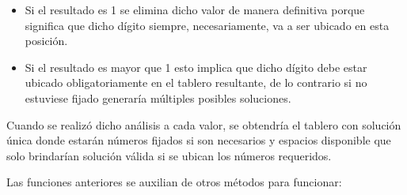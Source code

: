 \documentclass[10pt]{amsart}
\begin{document}
        \begin{itemize}
        
            \item Si el resultado es 1 se elimina dicho valor de manera definitiva porque significa que dicho d\'igito siempre, necesariamente, va a ser ubicado en esta posici\'on.
        
            \item Si el resultado es mayor que 1 esto implica que dicho d\'igito debe estar ubicado obligatoriamente en el tablero resultante, de lo contrario si no estuviese fijado generar\'ia m\'ultiples posibles soluciones.
    
        \end{itemize}	
    
        Cuando se realiz\'o dicho an\'alisis a cada valor, se obtendr\'ia el tablero con soluci\'on \'unica donde estar\'an n\'umeros fijados si son necesarios y espacios disponible que solo brindar\'ian soluci\'on v\'alida si se ubican los n\'umeros requeridos.
	 
        Las funciones anteriores se auxilian de otros m\'etodos para funcionar:
	 
\end{document}
